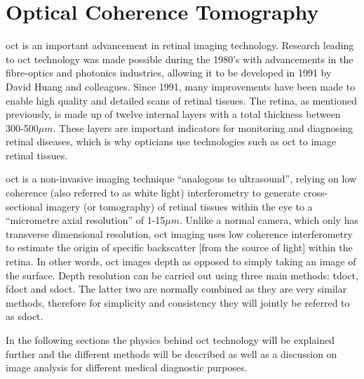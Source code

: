 \chapter{Optical Coherence Tomography}

\label{optical_coherence_tomography}

\Gls{oct} is an important advancement in retinal imaging
technology.  Research leading to \Gls{oct} technology was made possible during the
1980's with advancements in the fibre-optics and photonics industries, allowing it to be
developed in 1991 by David Huang and colleagues.\cite{mbib_1,mbib_2,mbib_3} 
Since 1991, many improvements have been made to enable high quality and detailed 
scans of retinal tissues.  The retina, as mentioned previously, is made up of twelve
internal layers with a total thickness between 300-500$\mu m$.\cite{mbib_4}
These layers are important indicators for monitoring and diagnosing retinal diseases,
which is why opticians use technologies such as \Gls{oct} to image retinal tissues.

\Gls{oct} is a non-invasive imaging technique
\enquote{analogous to ultrasound}, relying on low coherence (also
referred to as white light) interferometry to generate cross-sectional
imagery (or tomography) of retinal tissues within the eye to a
\enquote{micrometre axial resolution} of 1-15$\mu m$.\cite{mbib_5, mbib_6,mbib_2} Unlike a normal camera, which only has transverse dimensional resolution,
\Gls{oct} imaging uses low coherence interferometry to estimate the origin
of specific backscatter [from the source of light] within the retina.\cite{mbib_4} In
other words, \Gls{oct} images depth as opposed to simply taking an image
of the surface.  Depth resolution can be carried out using three main methods: \Gls{tdoct}, \Gls{fdoct} and \Gls{sdoct}. The latter two are normally combined
as they are very similar methods, therefore for simplicity and consistency
they will jointly be referred to as \Gls{sdoct}.

In the following sections the physics behind \Gls{oct} technology will be
explained further and the different methods will be described as well as
a discussion on image analysis for different medical diagnostic purposes.

